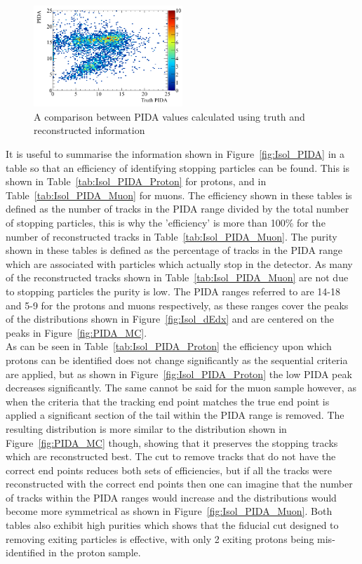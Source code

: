 \begin{figure}[h!]
  \centering
  \includegraphics[width=0.5\textwidth]{IsolatedProtons_500V_Dec16_Proton_MCPIDA_PIDA}
  \caption[A comparison between PIDA values calculated using truth and reconstructed information]
          {A comparison between PIDA values calculated using truth and reconstructed information}
  \label{fig:MCPIDA}
\end{figure}

It is useful to summarise the information shown in Figure~\ref{fig:Isol_PIDA} in a table so that an efficiency of identifying stopping particles can be found. This is shown in Table~\ref{tab:Isol_PIDA_Proton} for protons, and in Table~\ref{tab:Isol_PIDA_Muon} for muons. The efficiency shown in these tables is defined as the number of tracks in the PIDA range divided by the total number of stopping particles, this is why the 'efficiency' is more than 100\% for the number of reconstructed tracks in Table~\ref{tab:Isol_PIDA_Muon}. The purity shown in these tables is defined as the percentage of tracks in the PIDA range which are associated with particles which actually stop in the detector. As many of the reconstructed tracks shown in Table~\ref{tab:Isol_PIDA_Muon} are not due to stopping particles the purity is low. The PIDA ranges referred to are 14-18 and 5-9 for the protons and muons respectively, as these ranges cover the peaks of the distributions shown in Figure~\ref{fig:Isol_dEdx} and are centered on the peaks in Figure~\ref{fig:PIDA_MC}. \\

As can be seen in Table~\ref{tab:Isol_PIDA_Proton} the efficiency upon which protons can be identified does not change significantly as the sequential criteria are applied, but as shown in Figure~\ref{fig:Isol_PIDA_Proton} the low PIDA peak decreases significantly. The same cannot be said for the muon sample however, as when the criteria that the tracking end point matches the true end point is applied a significant section of the tail within the PIDA range is removed. The resulting distribution is more similar to the distribution shown in Figure~\ref{fig:PIDA_MC} though, showing that it preserves the stopping tracks which are reconstructed best. The cut to remove tracks that do not have the correct end points reduces both sets of efficiencies, but if all the tracks were reconstructed with the correct end points then one can imagine that the number of tracks within the PIDA ranges would increase and the distributions would become more symmetrical as shown in Figure~\ref{fig:Isol_PIDA_Muon}. Both tables also exhibit high purities which shows that the fiducial cut designed to removing exiting particles is effective, with only 2 exiting protons being mis-identified in the proton sample. \\

